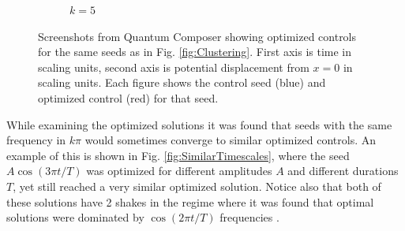 \documentclass[a4paper, twocolumn]{revtex4-1}
\begin{document}
\begin{figure}
\begin{subfigure}{0.4\columnwidth}
		\caption{$k=5$}
	\end{subfigure}
	\caption{Screenshots from Quantum Composer showing  optimized controls for the same seeds as in Fig. \ref{fig:Clustering}. First axis is time in scaling units, second axis is potential displacement from $x=0$ in scaling units. Each figure shows the control seed (blue) and  optimized control (red) for that seed.}
	\label{fig:similarSolutions}
\end{figure}

While examining the optimized solutions it was found that seeds with the same frequency in $k\pi$ would sometimes converge to similar optimized controls. An example of this is shown in Fig. \ref{fig:SimilarTimescales}, where the seed $A\cos(3\pi t/T)$ was optimized for different amplitudes $A$ and different durations $T$, yet still reached a very similar optimized solution. Notice also that both of these solutions have 2  shakes in the regime where it was found that optimal solutions were dominated by $\cos(2\pi t/T)$ frequencies \cite{QM2Paper}.
\end{document}
